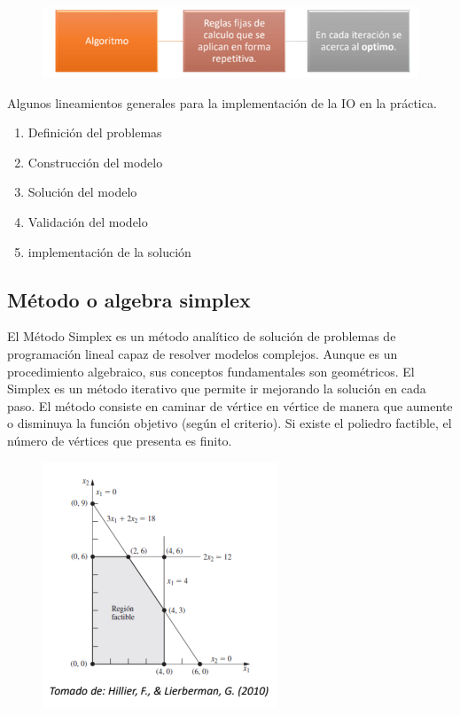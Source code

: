 \documentclass[conference]{IEEEtran}
\begin{document}
\begin{figure}[H]
    \begin{center}
        \includegraphics[width=\linewidth]{./Images/ProgramacionLineal.png}
        \caption{}
    \end{center}
\end{figure}

Algunos lineamientos generales para la implementación de la IO en la práctica.

\begin{enumerate}
    \item Definición del problemas
    \item Construcción del modelo
    \item Solución del modelo
    \item Validación del modelo
    \item implementación de la solución
\end{enumerate}

\subsection{Método o algebra simplex}

El Método Simplex es un método analítico de solución de problemas de 
programación lineal capaz de resolver modelos complejos. Aunque es un 
procedimiento algebraico, sus conceptos fundamentales son geométricos. 
El Simplex es un método iterativo que permite ir mejorando la solución en 
cada paso. El método consiste en caminar de vértice en vértice de manera que 
aumente o disminuya la función objetivo (según el criterio). Si existe el 
poliedro factible, el número de vértices que presenta es finito.

\begin{figure}[H]
    \begin{center}
        \includegraphics[width=.7\linewidth]{./Images/MetodoSimplex.png}
        \caption{}
    \end{center}
\end{figure}
\end{document}
